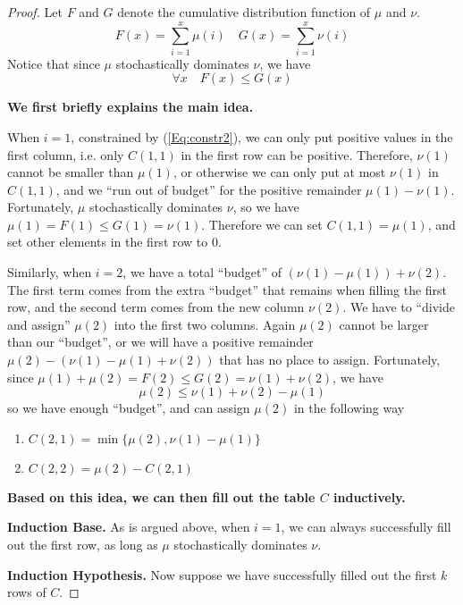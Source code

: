 \begin{proof}
            Let $F$ and $G$ denote the cumulative distribution function of $\mu$ and $\nu$.
            \[ F(x) = \sum_{i=1}^x\mu(i) \quad G(x) = \sum_{i=1}^x\nu(i) \]
            Notice that since $\mu$ stochastically dominates $\nu$, we have
            \[ \forall x \quad F(x) \le G(x) \]
        
            \textbf{We first briefly explains the main idea.}
        
            When $i=1$, constrained by (\ref{Eq:constr2}), we can only put positive values in the first column, i.e. only $C(1,1)$ in the first row can be positive. Therefore, $\nu(1)$ cannot be smaller than $\mu(1)$, or otherwise we can only put at most $\nu(1)$ in $C(1,1)$, and we ``run out of budget'' for the positive remainder $\mu(1)-\nu(1)$. Fortunately, $\mu$ stochastically dominates $\nu$, so we have $\mu(1) = F(1) \le G(1) = \nu(1)$. Therefore we can set $C(1,1) = \mu(1)$, and set other elements in the first row to $0$.
        
            Similarly, when $i=2$, we have a total ``budget'' of $(\nu(1) - \mu(1)) + \nu(2)$. The first term comes from the extra ``budget'' that remains when filling the first row, and the second term comes from the new column $\nu(2)$. We have to ``divide and assign'' $\mu(2)$ into the first two columns. Again $\mu(2)$ cannot be larger than our ``budget'', or we will have a positive remainder $\mu(2) - \left(\nu(1) - \mu(1) + \nu(2)\right)$ that has no place to assign. Fortunately, since $\mu(1) + \mu(2) = F(2) \le G(2) = \nu(1) + \nu(2)$, we have
            \[ \mu(2) \le \nu(1) + \nu(2) - \mu(1) \]
            so we have enough ``budget'', and can assign $\mu(2)$ in the following way
            \begin{enumerate}
                \item $C(2,1) = \min\{\mu(2), \nu(1) - \mu(1)\}$
                \item $C(2,2) = \mu(2) - C(2,1)$
            \end{enumerate}
        
            \textbf{Based on this idea, we can then fill out the table $C$ inductively.}
        
            \textbf{Induction Base.} As is argued above, when $i=1$, we can always successfully fill out the first row, as long as $\mu$ stochastically dominates $\nu$.
        
            \textbf{Induction Hypothesis.} Now suppose we have successfully filled out the first $k$ rows of $C$.
        

\end{proof}
